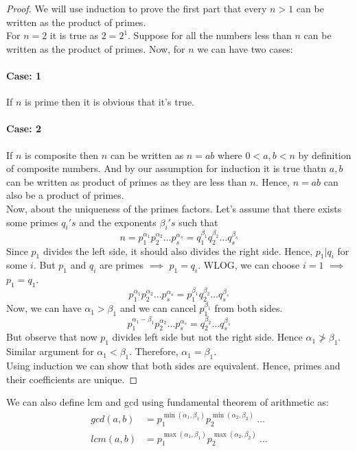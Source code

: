 \documentclass[12pt]{report}
\begin{document}
\begin{proof}
    We will use induction to prove the first part that every $n > 1$ can be written as the product of primes.\\
    For $n=2$ it is true as $ 2 = 2^1$. Suppose for all the numbers less than $n$ can be written as the product of primes. Now, for $n$ we can have two cases:
    \paragraph{Case: 1} If $n$ is prime then it is obvious that it's true.
    \paragraph{Case: 2} If $n$ is composite then $n$ can be written as $n = ab$ where $ 0 < a,b < n$ by definition of composite numbers. And by our assumption for induction it is true thatn $a,b$ can be written as product of primes as they are less than $n$. Hence, $n = ab$ can also be a product of primes. \\
    Now, about the uniqueness of the primes factors. Let's assume that there exists some primes $q_i's$ and the exponents $\beta_i's$ such that
    $$ n = p_1^{\alpha_1} p_2^{\alpha_2} \dots p_s^{\alpha_s} = q_1^{\beta_1} q_2^{\beta_2} \dots q_s^{\beta_s} $$
    Since $p_1$ divides the left side, it should also divides the right side. Hence, $p_1 | q_i$ for some $i$. But $p_1$ and $q_i$ are primes $\implies$ $p_1 = q_i$. WLOG, we can choose $i = 1$ $\implies$ $p_1 = q_1$.
    $$ p_1^{\alpha_1} p_2^{\alpha_2} \dots p_s^{\alpha_s} = p_1^{\beta_1} q_2^{\beta_2} \dots q_s^{\beta_s}$$
    Now, we can have $ \alpha_1 > \beta_1$ and we can cancel $p_1^{\beta_1}$ from both sides. 
    $$ p_1^{\alpha_1 - \beta_1} p_2^{\alpha_2} \dots p_s^{\alpha_s} = q_2^{\beta_2} \dots q_s^{\beta_s}$$
    But observe that now $p_1$ divides left side but not the right side. Hence $ \alpha_1 \ngtr \beta_1$. Similar argument for $ \alpha_1 < \beta_1$. 
    Therefore, $\alpha_1 = \beta_1$.\\
    Using induction we can show that both sides are equivalent. Hence, primes and their coefficients are unique.
\end{proof}
We can also define lcm and gcd using fundamental theorem of arithmetic as:
\begin{align*}
    gcd(a,b) &= p_1^{\min(\alpha_1,\beta_1)} p_2^{\min(\alpha_2,\beta_2)} ~\dots \\
    lcm(a,b) &= p_1^{\max(\alpha_1,\beta_1)} p_2^{\max(\alpha_2,\beta_2)} ~\dots    
\end{align*}
\end{document}
